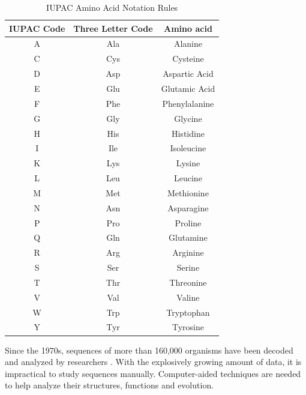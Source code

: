 \begin{table}[hbt]
\centering\small
\caption{IUPAC Amino Acid Notation Rules}\label{tab:code-aa}
\begin{tabular}{ccc} \toprule
  IUPAC Code  & Three Letter Code & Amino acid    \\ \hline
  A           & Ala               & Alanine       \\
  C           & Cys               & Cysteine      \\
  D           & Asp               & Aspartic Acid \\
  E           & Glu               & Glutamic Acid \\
  F           & Phe               & Phenylalanine \\
  G           & Gly               & Glycine       \\
  H           & His               & Histidine     \\
  I           & Ile               & Isoleucine    \\
  K           & Lys               & Lysine        \\
  L           & Leu               & Leucine       \\
  M           & Met               & Methionine    \\
  N           & Asn               & Asparagine    \\
  P           & Pro               & Proline       \\
  Q           & Gln               & Glutamine     \\
  R           & Arg               & Arginine      \\
  S           & Ser               & Serine        \\
  T           & Thr               & Threonine     \\
  V           & Val               & Valine        \\
  W           & Trp               & Tryptophan    \\
  Y           & Tyr               & Tyrosine      \\ \bottomrule
\end{tabular}
\end{table}

Since the 1970s, sequences of more than 160,000 organisms have been decoded and analyzed by researchers \cite{Benson:2007lr}. With the explosively growing amount of data, it is impractical to study sequences manually. Computer-aided techniques are needed to help analyze their structures, functions and evolution.

